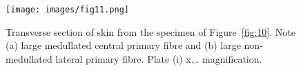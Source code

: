 %

\begin{figure}[h]
  \centering
  \texttt{[image: images/fig11.png]}
  \caption{Transverse section of skin from the specimen of 
      Figure~\ref{fig:10}.  Note
      (a) large medullated central primary fibre and (b) large non-
      medullated lateral primary fibre.
      Plate (i) x... magnification.}
  \label{fig:11}
\end{figure}

%
